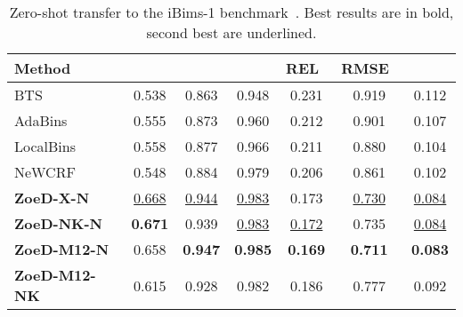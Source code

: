 \documentclass[10pt,twocolumn,letterpaper]{article}
\begin{document}
\begin{table}[htb]
\centering
\setlength{\tabcolsep}{3pt} \small
\begin{tabular}{@{}lcccccc@{}}
\toprule
Method &  &  &  & REL~ & RMSE~ & \\ \midrule
BTS~\cite{bts_lee2019big}               & 0.538     & 0.863     & 0.948     & 0.231     & 0.919     & 0.112    \\ 
AdaBins~\cite{bhat2021adabins}          & 0.555     & 0.873     & 0.960     & 0.212     & 0.901     & 0.107    \\ 
LocalBins~\cite{bhat2022localbins}      & 0.558     & 0.877     & 0.966     & 0.211     & 0.880     & 0.104     \\
NeWCRF~\cite{yuan2022new}               & 0.548     & 0.884     & 0.979     & 0.206     & 0.861     & 0.102     \\ 
\midrule
\textbf{ZoeD-X-N}       & \underline{0.668} & \underline{0.944} & \underline{0.983} &     0.173 &  \underline{0.730}  &    \underline{0.084} \\ 
\textbf{ZoeD-NK-N}      &  \textbf{0.671} & 0.939 & \underline{0.983} &     \underline{0.172} &  0.735 &    \underline{0.084} \\
\textbf{ZoeD-M12-N}     &  0.658 &         \textbf{ 0.947} &         \textbf{ 0.985} &               \textbf{0.169} &            \textbf{0.711} &              \textbf{0.083} \\
\textbf{ZoeD-M12-NK}   & 0.615 &          0.928 &          0.982 &               0.186 &            0.777 &              0.092 \\
\bottomrule
\end{tabular}
\caption{Zero-shot transfer to the iBims-1 benchmark~\cite{koch2019}. Best results are in bold, second best are underlined.}
\label{tab:ibims-full}
\end{table}
\end{document}
